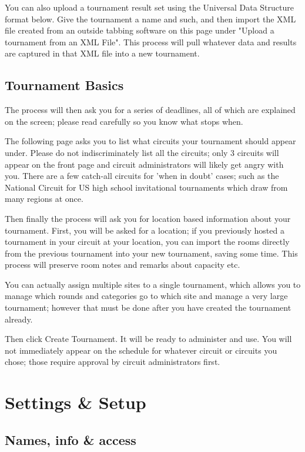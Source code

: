 \documentclass[12pt]{report}
\begin{document}
		You can also upload a tournament result set using the Universal Data
		Structure format below.  Give the tournament a name and such, and then
		import the XML file created from an outside tabbing software on this
		page under "Upload a tournament from an  XML File".  This
		process will pull whatever data and results are captured in that XML
		file into a new tournament.

	\section{Tournament Basics} 

		The process will then ask you for a series of deadlines, all of which
		are explained on the screen; please read carefully so you know what
		stops when.  
		
		The following page asks you to list what circuits your tournament
		should appear under.  Please do not indiscriminately list all the
		circuits; only 3 circuits will appear on the front page and circuit
		administrators will likely get angry with you.   There are a few
		catch-all circuits for 'when in doubt' cases; such as the National
		Circuit for US high school invitational tournaments which draw from
		many regions at once.

		Then finally the process will ask you for location based information
		about your tournament.  First, you will be asked for a location; if you
		previously hosted a tournament in your circuit at your location, you
		can import the rooms directly from the previous tournament into your
		new tournament, saving some time.  This process will preserve room
		notes and remarks about capacity etc.

		You can actually assign multiple sites to a single tournament, which
		allows you to manage which rounds and categories go to which site and
		manage a very large tournament; however that must be done after you
		have created the tournament already.

		Then click Create Tournament.  It will be ready to administer and use.
		You will not immediately appear on the schedule for whatever circuit or
		circuits you chose; those require approval by circuit administrators
		first.

\chapter{Settings \& Setup}

	\section{Names, info \& access}
\end{document}
